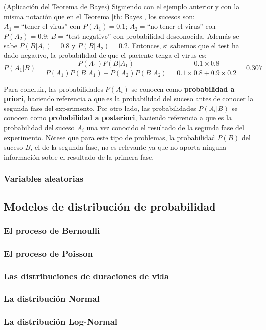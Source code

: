 \begin{example}(Aplicación del Teorema de Bayes)	
Siguiendo con el ejemplo anterior y con la misma notación que en el Teorema \ref{th: Bayes}, los sucesos son: $A_1 = \textrm{``tener el virus''}$ con $P(A_1) = 0.1$; $A_2 = \textrm{``no tener el virus''}$ con $P(A_2) = 0.9$; $B = \textrm{``test negativo''}$ con probabilidad desconocida. Además se sabe $P(B|A_1) = 0.8$ y $P(B|A_2) = 0.2$. Entonces, si sabemos que el test ha dado negativo, la probabilidad de que el paciente tenga el virus es:
$$P(A_1|B) = \frac{P(A_1)P(B|A_1)}{P(A_1)P(B|A_1)+ P(A_2)P(B|A_2)} = \frac{0.1 \times 0.8}{0.1 \times 0.8 + 0.9\times 0.2} = 0.307$$
\end{example}
Para concluir, las probabilidades $P(A_i)$ se conocen como \textbf{probabilidad a priori}, haciendo referencia a que es la probabilidad del suceso antes de conocer la segunda fase del experimento. Por otro lado, las probabilidades $P(A_i|B)$ se conocen como \textbf{probabilidad a posteriori}, haciendo referencia a que es la probabilidad del suceso $A_i$ una vez conocido el resultado de la segunda fase del experimento. Nótese que para este tipo de problemas, la probabilidad $P(B)$ del suceso $B$, el de la segunda fase, no es relevante ya que no aporta ninguna información sobre el resultado de la primera fase.
\subsubsection{Variables aleatorias}
\subsection{Modelos de distribución de probabilidad}
\subsubsection{El proceso de Bernoulli}
\subsubsection{El proceso de Poisson}
\subsubsection{Las distribuciones de duraciones de vida}
\subsubsection{La distribución Normal}
\subsubsection{La distribución Log-Normal}
